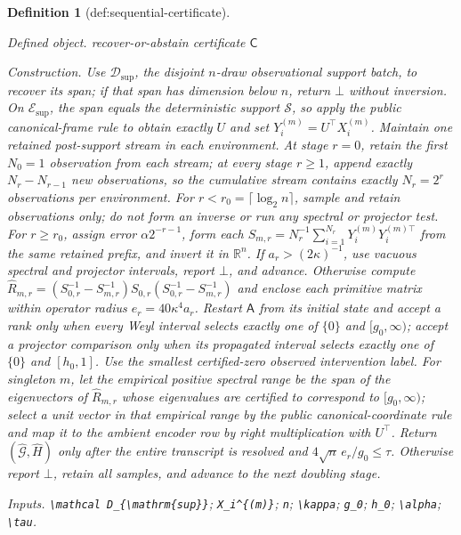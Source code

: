 \documentclass{article}
\newtheorem{definition}{Definition}
\begin{document}
\begin{definition}[def:sequential-certificate]\label{def:sequential-certificate}
\par\smallskip\noindent\emph{Defined object.} recover-or-abstain certificate \(\mathsf C\)
\par\smallskip\noindent\emph{Construction.} Use \(\mathcal D_{\mathrm{sup}}\), the disjoint \(n\)-draw observational support batch, to recover its span; if that span has dimension below \(n\), return \(\bot\) without inversion.  On \(\mathcal E_{\mathrm{sup}}\), the span equals the deterministic support \(\mathcal S\), so apply the public canonical-frame rule to obtain exactly \(U\) and set \(Y_i^{(m)}=U^{\top}X_i^{(m)}\).  Maintain one retained post-support stream in each environment.  At stage \(r=0\), retain the first \(N_0=1\) observation from each stream; at every stage \(r\ge1\), append exactly \(N_r-N_{r-1}\) new observations, so the cumulative stream contains exactly \(N_r=2^r\) observations per environment.  For \(r<r_0=\lceil\log_2 n\rceil\), sample and retain observations only; do not form an inverse or run any spectral or projector test.  For \(r\ge r_0\), assign error \(\alpha2^{-r-1}\), form each \(S_{m,r}=N_r^{-1}\sum_{i=1}^{N_r}Y_i^{(m)}Y_i^{(m)\top}\) from the same retained prefix, and invert it in \(\mathbb R^n\).  If \(a_r>(2\kappa)^{-1}\), use vacuous spectral and projector intervals, report \(\bot\), and advance.  Otherwise compute \(\widehat R_{m,r}=(S_{0,r}^{-1}-S_{m,r}^{-1})S_{0,r}(S_{0,r}^{-1}-S_{m,r}^{-1})\) and enclose each primitive matrix within operator radius \(e_r=40\kappa^4a_r\).  Restart \(\mathsf A\) from its initial state and accept a rank only when every Weyl interval selects exactly one of \(\{0\}\) and \([g_0,\infty)\); accept a projector comparison only when its propagated interval selects exactly one of \(\{0\}\) and \([h_0,1]\).  Use the smallest certified-zero observed intervention label.  For singleton \(m\), let the empirical positive spectral range be the span of the eigenvectors of \(\widehat R_{m,r}\) whose eigenvalues are certified to correspond to \([g_0,\infty)\); select a unit vector in that empirical range by the public canonical-coordinate rule and map it to the ambient encoder row by right multiplication with \(U^{\top}\).  Return \((\widehat{\mathcal G},\widehat H)\) only after the entire transcript is resolved and \(4\sqrt n\,e_r/g_0\le\tau\).  Otherwise report \(\bot\), retain all samples, and advance to the next doubling stage.
\par\smallskip\noindent\emph{Inputs.} \texttt{\textbackslash{}\allowbreak{}mathcal D\_\allowbreak{}\{\textbackslash{}\allowbreak{}mathrm\{sup\}\allowbreak{}\}\allowbreak{}}; \texttt{X\_\allowbreak{}i\textasciicircum{}\{(m)\}\allowbreak{}}; \texttt{n}; \texttt{\textbackslash{}\allowbreak{}kappa}; \texttt{g\_\allowbreak{}0}; \texttt{h\_\allowbreak{}0}; \texttt{\textbackslash{}\allowbreak{}alpha}; \texttt{\textbackslash{}\allowbreak{}tau}.
\end{definition}
\end{document}
